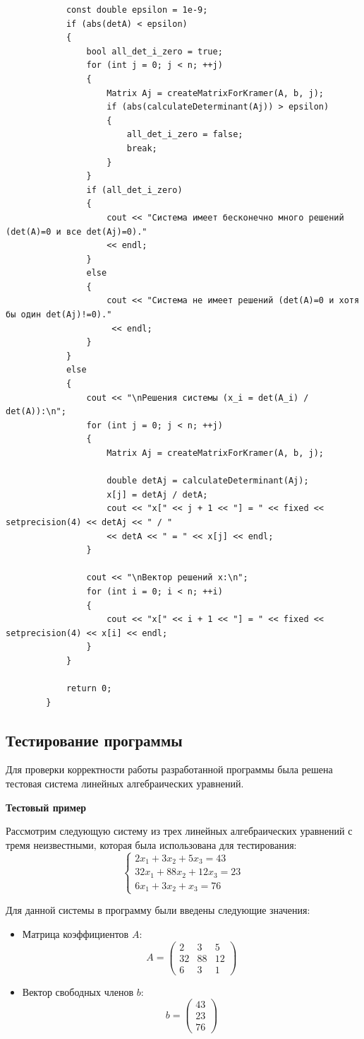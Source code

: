 \documentclass[12pt,a4paper]{scrartcl}
\begin{document}
\begin{verbatim}
			const double epsilon = 1e-9;
			if (abs(detA) < epsilon) 
			{
				bool all_det_i_zero = true;
				for (int j = 0; j < n; ++j) 
				{
					Matrix Aj = createMatrixForKramer(A, b, j);
					if (abs(calculateDeterminant(Aj)) > epsilon) 
					{
						all_det_i_zero = false;
						break;
					}
				}
				if (all_det_i_zero) 
				{
					cout << "Система имеет бесконечно много решений (det(A)=0 и все det(Aj)=0)." 
					<< endl;
				}
				else 
				{
					cout << "Система не имеет решений (det(A)=0 и хотя бы один det(Aj)!=0)."
					 << endl;
				}
			}
			else 
			{
				cout << "\nРешения системы (x_i = det(A_i) / det(A)):\n";
				for (int j = 0; j < n; ++j) 
				{ 
					Matrix Aj = createMatrixForKramer(A, b, j);
					
					double detAj = calculateDeterminant(Aj);
					x[j] = detAj / detA;
					cout << "x[" << j + 1 << "] = " << fixed << setprecision(4) << detAj << " / " 
					<< detA << " = " << x[j] << endl;
				}
				
				cout << "\nВектор решений x:\n";
				for (int i = 0; i < n; ++i) 
				{
					cout << "x[" << i + 1 << "] = " << fixed << setprecision(4) << x[i] << endl;
				}
			}
			
			return 0;
		}
	\end{verbatim}
	
	\subsection{Тестирование программы}
	
	Для проверки корректности работы разработанной программы была решена тестовая система линейных алгебраических уравнений.
	
	\vspace{1.5ex}
	
	\noindent\textbf{Тестовый пример} 
	\vspace{1ex}
	
	Рассмотрим следующую систему из трех линейных алгебраических уравнений с тремя неизвестными, которая была использована для тестирования:
	\[
	\begin{cases} 
		2x_1 + 3x_2 + 5x_3 = 43 \\
		32x_1 + 88x_2 + 12x_3 = 23 \\
		6x_1 + 3x_2 + x_3 = 76
	\end{cases}
	\]
	
	Для данной системы в программу были введены следующие значения:
	\begin{itemize}
		\item Матрица коэффициентов $A$:
		\[ A = \begin{pmatrix} 
			2 & 3 & 5 \\
			32 & 88 & 12 \\
			6 & 3 & 1 
		\end{pmatrix} \]
		\item Вектор свободных членов $b$:
		\[ b = \begin{pmatrix} 
			43 \\ 23 \\ 76 
		\end{pmatrix} \]
	\end{itemize}
	
\end{document}
